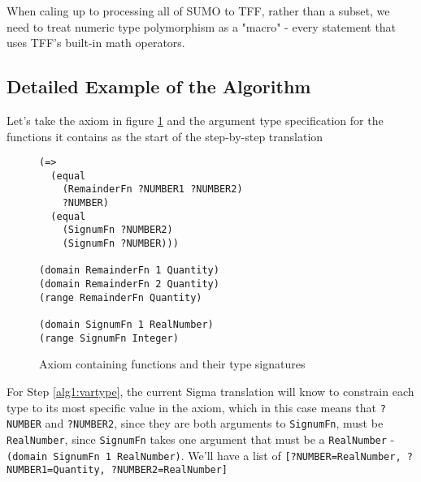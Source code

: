 \documentclass{article}
\begin{document}
When caling up to processing all of SUMO to TFF, rather than a subset, we need
to treat numeric type polymorphism as a "macro" - every statement that uses
TFF's built-in math operators.


\subsection{Detailed Example of the Algorithm}

Let's take the axiom in figure \ref{fig:RemainderFn} and the argument type
specification for the functions it contains as the start of the step-by-step
translation

\begin{figure}[H]
\begin{framed}
\begin{verbatim}
(=>
  (equal 
    (RemainderFn ?NUMBER1 ?NUMBER2) 
    ?NUMBER)
  (equal 
    (SignumFn ?NUMBER2) 
    (SignumFn ?NUMBER)))
	
(domain RemainderFn 1 Quantity)
(domain RemainderFn 2 Quantity)	
(range RemainderFn Quantity)

(domain SignumFn 1 RealNumber)	
(range SignumFn Integer)
\end{verbatim}
\end{framed}
\caption{Axiom containing functions and their type signatures}
\label{fig:RemainderFn}
\end{figure}

\begin{sloppypar}For Step \ref{alg1:vartype}, the current Sigma translation will know
to constrain each type to its most specific value in the axiom, which in this
case means that \texttt{?NUMBER} and \texttt{?NUMBER2}, since they are both
arguments to \texttt{SignumFn}, must be \texttt{RealNumber}, since
\texttt{SignumFn} takes one argument that must be a \texttt{RealNumber} -
\texttt{(domain SignumFn 1 RealNumber)}.  We'll have a list of
\texttt{[?NUMBER=RealNumber, ?NUMBER1=Quantity, ?NUMBER2=RealNumber]}
\end{sloppypar}
\end{document}
